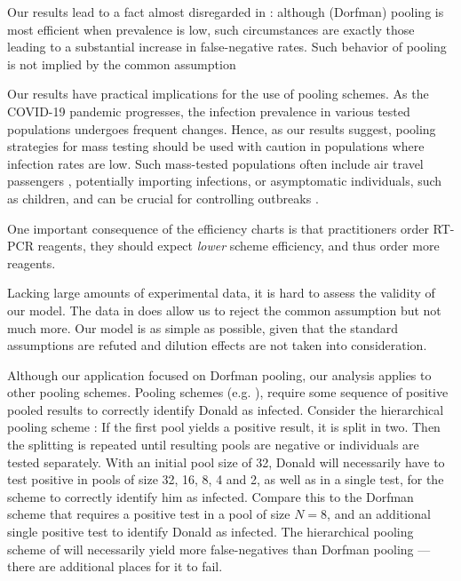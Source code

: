 \documentclass{article}
\begin{document}
Our results lead to a fact almost disregarded in
\cite{DorfmanYuvalDor}: although (Dorfman) pooling is most efficient
when prevalence is low, such circumstances are exactly those leading
to a substantial increase in false-negative rates. Such behavior of
pooling is not implied by the common assumption

Our results have practical implications for the use of pooling
schemes. As the COVID-19 pandemic progresses, the infection prevalence
in various tested populations undergoes frequent changes. Hence, as
our results suggest, pooling strategies for mass testing should be
used with caution in populations where infection rates are low. Such
mass-tested populations often include air travel passengers
\cite{JTM,RobinHood}, potentially importing infections, or
asymptomatic individuals, such as children, and can be crucial for
controlling outbreaks \cite{MinaScience}.

One important consequence of the efficiency charts is that
practitioners order RT-PCR reagents, they should expect \emph{lower}
scheme efficiency, and thus order more reagents.

Lacking large amounts of experimental data, it is hard to assess the
validity of our model. The data in \cite{Salazar} does allow us to
reject the common assumption but not much more. Our model is as simple
as possible, given that the standard assumptions are refuted and
dilution effects are not taken into consideration.

Although our application focused on Dorfman pooling, our analysis
applies to other pooling schemes. Pooling schemes
(e.g. \cite{MatrixPooling,Lion, Kim}), require some sequence of
positive pooled results to correctly identify Donald as
infected. Consider the hierarchical pooling scheme \cite{Lion, Kim}:
If the first pool yields a positive result, it is split in two. Then
the splitting is repeated until resulting pools are negative or
individuals are tested separately. With an initial pool size of 32,
Donald will necessarily have to test positive in pools of size 32, 16,
8, 4 and 2, as well as in a single test, for the scheme to correctly
identify him as infected. Compare this to the Dorfman scheme that
requires a positive test in a pool of size $N=8$, and an additional
single positive test to identify Donald as infected. The hierarchical
pooling scheme of \cite{Lion, Kim} will necessarily yield more
false-negatives than Dorfman pooling --- there are additional places
for it to fail.
\end{document}
